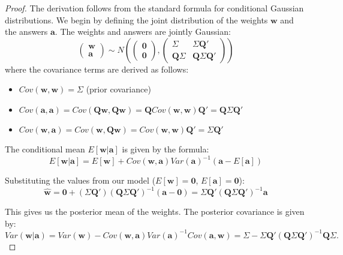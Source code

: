 \documentclass[\ifdraft draft\fi]{article}
\begin{document}
\begin{greyproof}
\begin{proof}
The derivation follows from the standard formula for conditional Gaussian distributions. We begin by defining the joint distribution of the weights $\bm{w}$ and the answers $\bm{a}$. The weights and answers are jointly Gaussian:
   \[\begin{pmatrix} \bm{w} \\ \bm{a} \end{pmatrix} \sim N\left(
      \begin{pmatrix} \bm{0} \\ \bm{0} \end{pmatrix},
      \begin{pmatrix} 
         \Sigma & \Sigma \bm{Q}' \\
         \bm{Q}\Sigma & \bm{Q}\Sigma \bm{Q}'
      \end{pmatrix}
   \right)
   \]
where the covariance terms are derived as follows:
\begin{itemize}
    \item $Cov(\bm{w}, \bm{w}) = \Sigma$ (prior covariance)
    \item $Cov(\bm{a}, \bm{a}) = Cov(\bm{Q}\bm{w}, \bm{Q}\bm{w}) = \bm{Q} Cov(\bm{w}, \bm{w}) \bm{Q}' = \bm{Q}\Sigma \bm{Q}'$
    \item $Cov(\bm{w}, \bm{a}) = Cov(\bm{w}, \bm{Q}\bm{w}) = Cov(\bm{w}, \bm{w})\bm{Q}' = \Sigma \bm{Q}'$
\end{itemize}
The conditional mean $E[\bm{w}|\bm{a}]$ is given by the formula:
   \[E[\bm{w}|\bm{a}] = E[\bm{w}] + Cov(\bm{w},\bm{a})Var(\bm{a})^{-1}(\bm{a} - E[\bm{a}])\]

Substituting the values from our model ($E[\bm{w}] = \bm{0}$, $E[\bm{a}] = \bm{0}$):
   \[\hat{\bm{w}} = \bm{0} + (\Sigma \bm{Q}')(\bm{Q}\Sigma \bm{Q}')^{-1}(\bm{a} - \bm{0}) = \Sigma \bm{Q}'(\bm{Q}\Sigma \bm{Q}')^{-1}\bm{a}\]

This gives us the posterior mean of the weights. The posterior covariance is given by:
   \[Var(\bm{w}|\bm{a}) = Var(\bm{w}) - Cov(\bm{w},\bm{a})Var(\bm{a})^{-1}Cov(\bm{a},\bm{w}) = \Sigma - \Sigma \bm{Q}'(\bm{Q}\Sigma \bm{Q}')^{-1}\bm{Q}\Sigma.\]
\end{proof}
\end{greyproof}
\end{document}
